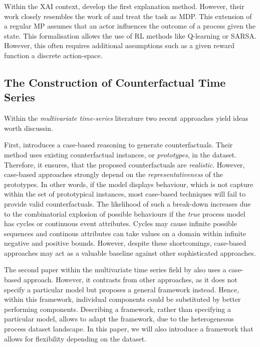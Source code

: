\documentclass[12pt,a4paper]{report}
\begin{document}
Within the \gls{XAI} context, \citeauthor{tsirtsis_CounterfactualExplanationsSequential_2021} develop the first explanation method. However, their work closely resembles the work of \citeauthor{oberst_CounterfactualOffPolicyEvaluation_2019} and treat the task as \gls{MDP}. This extension of a regular \gls{MP} assumes that an actor influences the outcome of a process given the state. This formalisation allows the use of \gls{RL} methods like Q-learning or SARSA\needscite. However, this often requires additional assumptions such as a given reward function a discrete action-space. 

\subsection{The Construction of Counterfactual Time Series}
Within the \emph{multivariate time-series} literature two recent approaches yield ideas worth discussin.

First, \citeauthor{delaney_InstanceBasedCounterfactualExplanations_2021} introduces a case-based reasoning to generate counterfactuals. Their method uses existing counterfactual instances, or \emph{prototypes}, in the dataset. Therefore, it ensures, that the proposed counterfactuals are \emph{realistic}. However, case-based approaches strongly depend on the \emph{representativeness} of the prototypes\needscite. In other words, if the model displays behaviour, which is not capture within the set of prototypical instances, most case-based techniques will fail to provide valid counterfactuals. The likelihood of such a break-down increases due to the combinatorial explosion of possible behaviours if the \emph{true} process model has cycles or continuous event attributes. Cycles may cause infinite possible sequences and continous attributes can take values on a domain within infinite negative and positive bounds. However, despite these shortcomings, case-based approaches may act as a valuable baseline against other sophisticated approaches.

The second paper within the multivariate time series field by \citeauthor{ates_CounterfactualExplanationsMultivariate_2021} also uses a case-based approach. However, it contrasts from other approaches, as it does not specify a particular model but proposes a general framework instead. Hence, within this framework, individual components could be substituted by better performing components. Describing a framework, rather than specifying a particular model, allows to adapt the framework, due to the heterogeneous process dataset landscape. In this paper, we will also introduce a framework that allows for flexibility depending on the dataset. 
\end{document}
